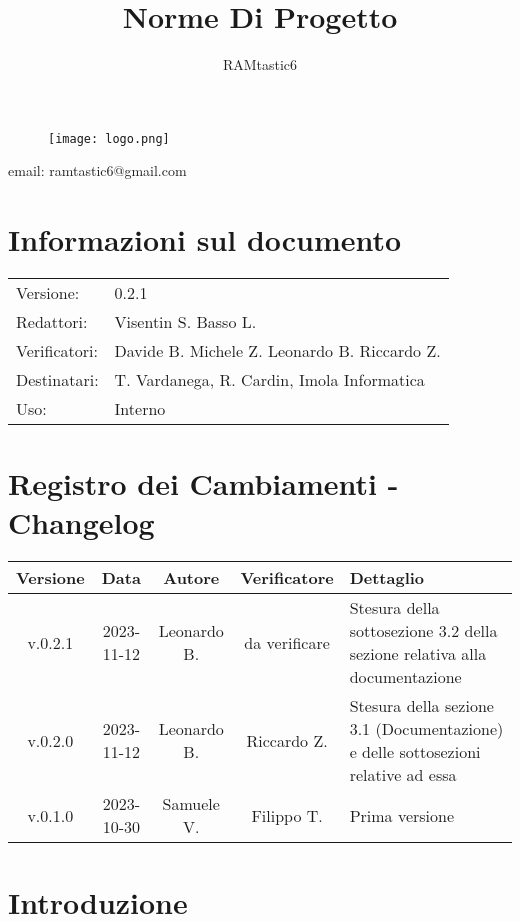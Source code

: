 \documentclass[12pt, oneside]{article}
\author{RAMtastic6}
\begin{document}
\thispagestyle{empty}
\title{Norme Di Progetto}
\maketitle
\begin{figure}[h]
  \centering
  \texttt{[image: logo.png]}
\end{figure}
\begin{center}
    email: ramtastic6@gmail.com
\end{center}

\section*{Informazioni sul documento}
\begin{tabular}{ll}
Versione: & 0.2.1 \\
Redattori: &  Visentin S.  Basso L. \\
Verificatori: & Davide B. Michele Z. Leonardo B. Riccardo Z. \\
Destinatari: & T. Vardanega, R. Cardin, Imola Informatica \\
Uso: & Interno
\end{tabular}
\newpage

\section*{Registro dei Cambiamenti - Changelog}
\begin{tabular}{|c|c|c|c|p{6cm}|}
\hline
\textbf{Versione} & \textbf{Data} & \textbf{Autore} & \textbf{Verificatore} & \textbf{Dettaglio} \\
\hline
v.0.2.1 & 2023-11-12 & Leonardo B. & da verificare & Stesura della sottosezione 3.2 della sezione relativa alla documentazione \\
\hline
v.0.2.0 & 2023-11-12 & Leonardo B. & Riccardo Z. & Stesura della sezione 3.1 (Documentazione) e delle sottosezioni relative ad essa \\
\hline
v.0.1.0 & 2023-10-30 & Samuele V. & Filippo T. & Prima versione \\
\hline
\end{tabular}
\newpage

\tableofcontents
\newpage
\section{Introduzione}
\end{document}
